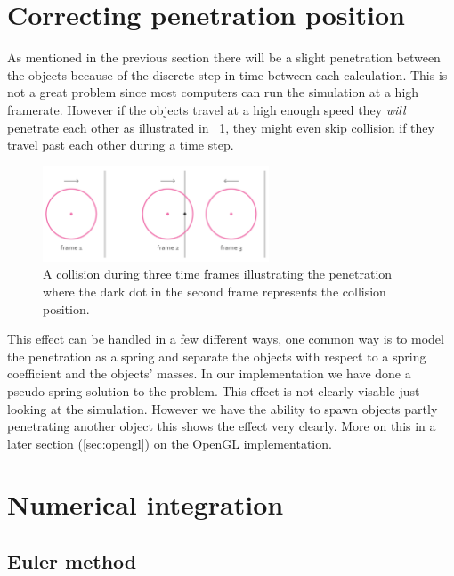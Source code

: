 \documentclass[a4paper,12pt]{report}
\begin{document}
\section{Correcting penetration position}

As mentioned in the previous section there will be a slight penetration between the objects because of the discrete step in time between each calculation. This is not a great problem since most computers can run the simulation at a high framerate. However if the objects travel at a high enough speed they \emph{will} penetrate each other as illustrated in ~\ref{fig:penetration}, they might even skip collision if they travel past each other during a time step.

\begin{figure}[!ht]
    \centering
    \includegraphics[width=0.6\textwidth]{figures/penetration.png}
    \caption{A collision during three time frames illustrating the penetration  where the dark dot in the second frame represents the collision position.}
    \label{fig:penetration}
\end{figure}

This effect can be handled in a few different ways, one common way is to model the penetration as a spring and separate the objects with respect to a spring coefficient and the objects' masses. In our implementation we have done a pseudo-spring solution to the problem. This effect is not clearly visable just looking at the simulation. However we have the ability to spawn objects partly penetrating another object this shows the effect very clearly. More on this in a later section (\ref{sec:opengl}) on the OpenGL implementation.


\section{Numerical integration}

\subsection{Euler method}
\end{document}
